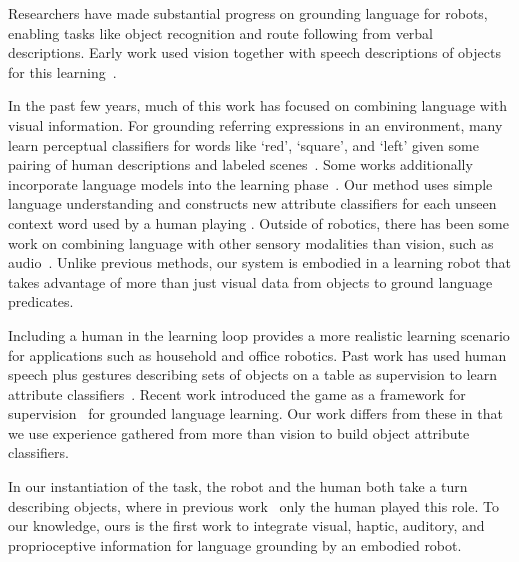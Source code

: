 Researchers have made substantial progress on grounding language for robots, enabling tasks like object recognition and route following from verbal descriptions. 
Early work used vision together with speech descriptions of objects for this learning~\cite{roy:cogsci02}.

In the past few years, much of this work has focused on combining language with visual information. 
For grounding referring expressions in an environment, many learn perceptual classifiers for words like `red', `square', and `left' given some pairing of human descriptions and labeled scenes~\cite{liu:acl14,malinowski:nips14,mohan:acs13,sun:icra13,dindo:iros10,vogel:aaai10}. 
Some works additionally incorporate language models into the learning phase~\cite{spranger:ijcai15,krishnamurthy:acl13,perera:aaai13,matuszek:icml12}. 
Our method uses simple language understanding and constructs new attribute classifiers for each unseen context word used by a human playing \ispy. 
Outside of robotics, there has been some work on combining language with other sensory modalities than vision, such as audio~\cite{kiela:emnlp15}. 
Unlike previous methods, our system is embodied in a learning robot that takes advantage of more than just visual data from objects to ground language predicates.

Including a human in the learning loop provides a more realistic learning scenario for applications such as household and office robotics. 
Past work has used human speech plus gestures describing sets of objects on a table as supervision to learn attribute classifiers~\cite{matuszek:aaai14,kollar:rss13}. 
Recent work introduced the \ispy game as a framework for supervision~\cite{parde:ijcai15} for grounded language learning. 
Our work differs from these in that we use experience gathered from more than vision to build object attribute classifiers. 

In our instantiation of the \ispy task, the robot and the human both take a turn describing objects, where in previous work~ only the human played this role. 
To our knowledge, ours is the first work to integrate visual, haptic, auditory, and proprioceptive information for language grounding by an embodied robot.

